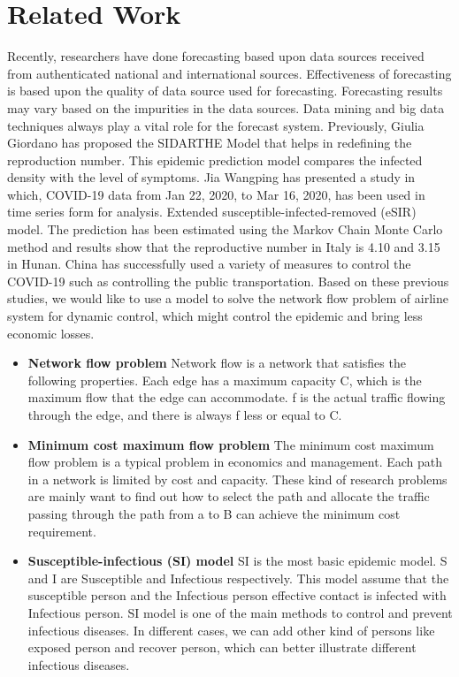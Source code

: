 
\section{Related Work}
Recently, researchers have done forecasting based upon data sources received from authenticated national and international sources. Effectiveness of forecasting is based upon the quality of data source used for forecasting. Forecasting results may vary based on the impurities in the data sources. Data mining and big data techniques always play a vital role for the forecast system\cite{huang2018air}. Previously, Giulia Giordano\cite{giordano2020sidarthe} has proposed the SIDARTHE Model that helps in redefining the reproduction number. This epidemic prediction model compares the infected density with the level of symptoms. Jia Wangping\cite{wangping2020extended} has presented a study in which, COVID-19 data from Jan 22, 2020, to Mar 16, 2020, has been used in time series form for analysis. Extended susceptible-infected-removed (eSIR) model. The prediction has been estimated using the Markov Chain Monte Carlo method and results show that the reproductive number in Italy is 4.10 and 3.15 in Hunan. China has successfully used a variety of measures to control the COVID-19 such as controlling the public transportation\cite{shen2020prevention,kucharski2020early}. Based on these previous studies, we would like to use a model to solve the network flow problem of airline system for dynamic control, which might control the epidemic and bring less economic losses. 
\begin{itemize}
    \item \textbf{Network flow problem}
    Network flow is a network that satisfies the following properties. Each edge has a maximum capacity C, which is the maximum flow that the edge can accommodate. f is the actual traffic flowing through the edge, and there is always f less or equal to C.
    \item \textbf{Minimum cost maximum flow problem}
The minimum cost maximum flow problem is a typical problem in economics and management. Each path in a network is limited by cost and capacity. These kind of research problems are mainly want to find out how to select the path and allocate the traffic passing through the path from a to B can achieve the minimum cost requirement.
    \item \textbf{Susceptible-infectious (SI) model }
    SI is the most basic epidemic model. S and I are Susceptible and Infectious respectively. This model assume that the susceptible person and the Infectious person effective contact is infected with Infectious person. SI model is one of the main methods to control and prevent infectious diseases. In different cases, we can add other kind of persons like exposed person and recover person, which can better illustrate different infectious diseases.

\end{itemize}